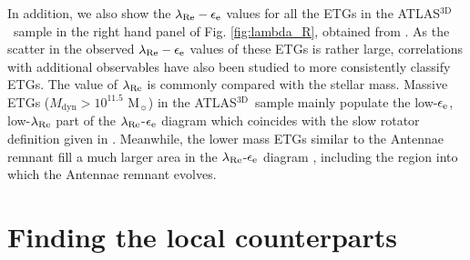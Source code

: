 \documentclass[a4paper,fleqn,usenatbib]{mnras}
\newcommand{\atlas}{\textsc{ATLAS$^\mathrm{3D}$}}
\begin{document}
In addition, we also show the $\lambda_{\rm{Re}}-\epsilon_{\rm{e}}$ values for 
all the ETGs in the \atlas\ sample in the right hand panel of Fig. \ref{fig:lambda_R}, obtained from \citet{2011MNRAS.414..888E}.
As the scatter in the observed $\lambda_{\rm{Re}}-\epsilon_{\rm{e}}$ values of these ETGs is rather large, 
correlations with additional observables have also been studied to more consistently
classify ETGs. The value of $\lambda_{\rm{Re}}$ 
is commonly compared with the stellar mass. 
Massive ETGs ($M_{\mathrm{dyn}}>10^{11.5}$ M$_{\sun}$) in the \atlas\ sample
mainly populate the low-$\epsilon_{\rm{e}}$, low-$\lambda_{\rm{Re}}$ part of the $\lambda_{\rm{Re}}$-$\epsilon_{\rm{e}}$
diagram which coincides with the slow rotator definition
given in \citet{2016ARA&A..54..597C}. Meanwhile, the lower mass ETGs similar to the Antennae remnant
fill a much larger area in the $\lambda_{\rm{Re}}$-$\epsilon_{\rm{e}}$ diagram \citep{2011MNRAS.414..888E}, including the region 
into which the Antennae remnant evolves.





\section{Finding the local counterparts}\label{section:atlas_counterpart}
\end{document}
